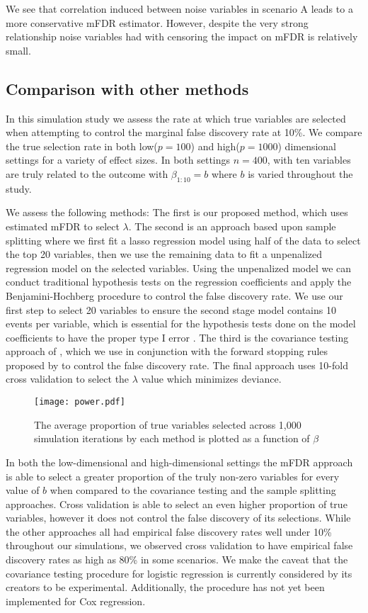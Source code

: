 We see that correlation induced between noise variables in scenario A leads to a more conservative mFDR estimator.  However, despite the very strong relationship noise variables had with censoring the impact on mFDR is relatively small.

\subsection{Comparison with other methods}

In this simulation study we assess the rate at which true variables are selected when attempting to control the marginal false discovery rate at 10\%. We compare the true selection rate in both low($p = 100$) and high($p=1000$) dimensional settings for a variety of effect sizes. In both settings $n = 400$, with ten variables are truly related to the outcome with $\beta_{1:10} = b$ where $b$ is varied throughout the study.  

We assess the following methods: The first is our proposed method, which uses estimated mFDR to select $\lambda$.  The second is an approach based upon sample splitting \citep{Sample_Splitting} where we first fit a lasso regression model using half of the data to select the top 20 variables, then we use the remaining data to fit a unpenalized regression model on the selected variables.  Using the unpenalized model we can conduct traditional hypothesis tests on the regression coefficients and apply the Benjamini-Hochberg procedure \citep{BH_1995} to control the false discovery rate. We use our first step to select 20 variables to ensure the second stage model contains 10 events per variable, which is essential for the hypothesis tests done on the model coefficients to have the proper type I error \citep{peduzzi_epv}. The third is the covariance testing approach of \citet{CovTest}, which we use in conjunction with the forward stopping rules proposed by \citet{GSell2016} to control the false discovery rate. The final approach uses 10-fold cross validation to select the $\lambda$ value which minimizes deviance.

\begin{figure} [!htb]
 \centering
  \texttt{[image: power.pdf]}
  \caption{The average proportion of true variables selected across 1,000 simulation iterations by each method is plotted as a function of $\beta$ }
\end{figure}

In both the low-dimensional and high-dimensional settings the mFDR approach is able to select a greater proportion of the truly non-zero variables for every value of $b$ when compared to the covariance testing and the sample splitting approaches. Cross validation is able to select an even higher proportion of true variables, however it does not control the false discovery of its selections. While the other approaches all had empirical false discovery rates well under 10\% throughout our simulations, we observed cross validation to have empirical false discovery rates as high as 80\% in some scenarios.  We make the caveat that the covariance testing procedure for logistic regression is currently considered by its creators to be experimental.  Additionally, the procedure has not yet been implemented for Cox regression.

